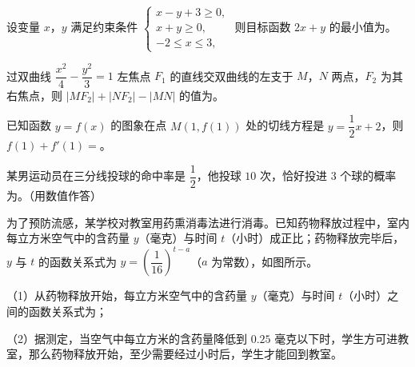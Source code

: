 \begin{question}
设变量 $x$，$y$ 满足约束条件 $\begin{cases}x-y+3\geqslant0,\\ x+y\geqslant0,\\ -2\leqslant x\leqslant3,\end{cases}$ 则目标函数 $2x+y$ 的最小值为\gkblank{}。

\end{question}
\begin{question}
过双曲线 $\dfrac{x^2}{4}-\dfrac{y^2}{3}=1$ 左焦点 $F_1$ 的直线交双曲线的左支于 $M$，$N$ 两点，$F_2$ 为其右焦点，则 $|MF_2|+|NF_2|-|MN|$ 的值为\gkblank{}。

\end{question}
\begin{question}
已知函数 $y=f(x)$ 的图象在点 $M(1,f(1))$ 处的切线方程是 $y=\dfrac12x+2$，则 $f(1)+f'(1)=$\gkblank{}。

\end{question}
\begin{question}
某男运动员在三分线投球的命中率是 $\dfrac12$，他投球 $10$ 次，恰好投进 $3$ 个球的概率为\gkblank{}。（用数值作答）

\Needspace{0.4\textheight}
\end{question}
\begin{question}
为了预防流感，某学校对教室用药熏消毒法进行消毒。已知药物释放过程中，室内每立方米空气中的含药量 $y$（毫克）与时间 $t$（小时）成正比；药物释放完毕后，$y$ 与 $t$ 的函数关系式为 $y=\left(\dfrac1{16}\right)^{t-a}$（$a$ 为常数），如图所示。

（1）从药物释放开始，每立方米空气中的含药量 $y$（毫克）与时间 $t$（小时）之间的函数关系式为\gkblank{}；

（2）据测定，当空气中每立方米的含药量降低到 $0.25$ 毫克以下时，学生方可进教室，那么药物释放开始，至少需要经过\gkblank{}小时后，学生才能回到教室。
\nopagebreak[4]
\begin{center}\end{center}
\nopagebreak[4]
\end{question}

